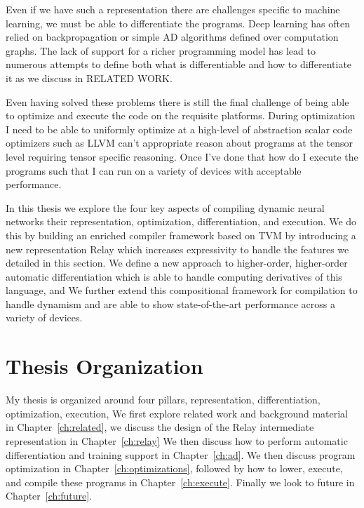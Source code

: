 Even if we have such a representation there are challenges specific to
 machine learning, we must be able to differentiate the programs.
Deep learning has often relied on backpropagation or simple AD algorithms
  defined over computation graphs.
The lack of support for a richer programming model has lead to numerous
  attempts to define both what is differentiable and how to differentiate
  it as we discuss in RELATED WORK.

Even having solved these problems there is still the final challenge of being
  able to optimize and execute the code on the requisite platforms.
During optimization I need to be able to uniformly optimize at a high-level
  of abstraction scalar code optimizers such as LLVM can't appropriate reason
  about programs at the tensor level requiring tensor specific reasoning.
Once I've done that how do I execute the programs such that I can run
  on a variety of devices with acceptable performance.


In this thesis we explore the four key aspects of compiling dynamic
  neural networks their representation, optimization, differentiation,
  and execution.
We do this by building an enriched compiler framework based on TVM by introducing
  a new representation Relay which increases expressivity to handle the features
  we detailed in this section.
We define a new approach to higher-order, higher-order automatic differentiation
  which is able to handle computing derivatives of this language, and
We further extend this compositional framework for compilation to handle dynamism
  and are able to show state-of-the-art performance across a variety of devices.

\section{Thesis Organization}

My thesis is organized around four pillars, representation, differentiation, optimization, execution,
We first explore related work and background material in Chapter~\ref{ch:related},
  we discuss the design of the Relay intermediate representation in Chapter~\ref{ch:relay}
We then discuss how to perform automatic differentiation and training support in Chapter~\ref{ch:ad}.
We then discuss program optimization in Chapter~\ref{ch:optimizations},
  followed by how to lower, execute, and compile these programs in
  Chapter~\ref{ch:execute}.
Finally we look to future in Chapter~\ref{ch:future}.
